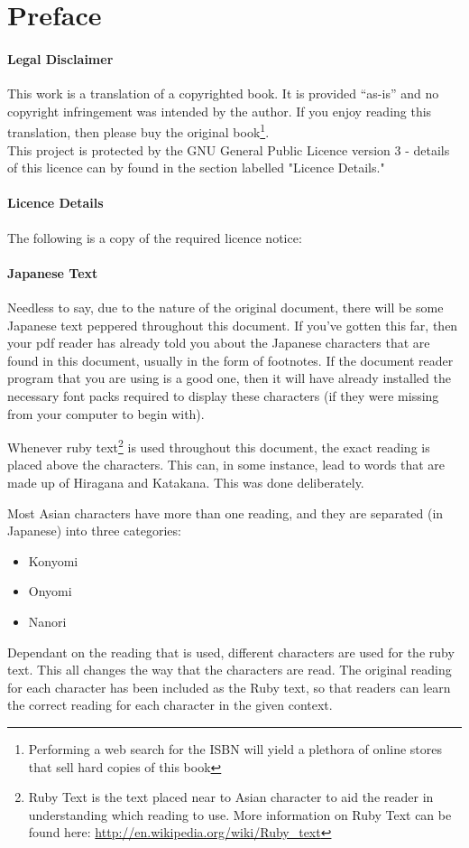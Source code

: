 \chapter*{Preface}
\subsubsection{Legal Disclaimer}
This work is a translation of a copyrighted book. It is provided ``as-is'' and no copyright infringement was intended by the author. If you enjoy reading this translation, then please buy the original book\footnote{Performing a web search for the ISBN will yield a plethora of online stores that sell hard copies of this book}.\\
This project is protected by the GNU General Public Licence version 3 - details of this licence can by found in the section labelled "Licence Details."
\subsubsection{Licence Details}
The following is a copy of the required licence notice:\\ %
\subsubsection{Japanese Text}
Needless to say, due to the nature of the original document, there will be some Japanese text peppered throughout this document. If you've gotten this far, then your pdf reader has already told you about the Japanese characters that are found in this document, usually in the form of footnotes. If the document reader program that you are using is a good one, then it will have already installed the necessary font packs required to display these characters (if they were missing from your computer to begin with).
\par Whenever ruby text\footnote{Ruby Text is the text placed near to Asian character to aid the reader in understanding which reading to use. More information on Ruby Text can be found here: \url{http://en.wikipedia.org/wiki/Ruby_text}} is used throughout this document, the exact reading is placed above the characters. This can, in some instance, lead to words that are made up of Hiragana and Katakana. This was done deliberately.
\par Most Asian characters have more than one reading, and they are separated (in Japanese) into three categories:
\begin{itemize}
\item Konyomi
\item Onyomi
\item Nanori
\end{itemize}
Dependant on the reading that is used, different characters are used for the ruby text. This all changes the way that the characters are read. The original reading for each character has been included as the Ruby text, so that readers can learn the correct reading for each character in the given context.